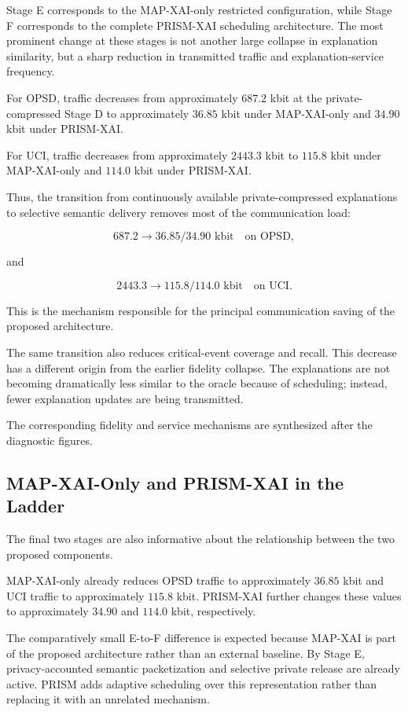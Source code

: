 \documentclass[11pt]{article}
\begin{document}
Stage E corresponds to the MAP-XAI-only restricted configuration, while Stage F corresponds to the complete PRISM-XAI scheduling architecture. The most prominent change at these stages is not another large collapse in explanation similarity, but a sharp reduction in transmitted traffic and explanation-service frequency.

For OPSD, traffic decreases from approximately \(687.2\) kbit at the private-compressed Stage D to approximately \(36.85\) kbit under MAP-XAI-only and \(34.90\) kbit under PRISM-XAI.

For UCI, traffic decreases from approximately \(2443.3\) kbit to \(115.8\) kbit under MAP-XAI-only and \(114.0\) kbit under PRISM-XAI.

Thus, the transition from continuously available private-compressed explanations to selective semantic delivery removes most of the communication load:

$$
687.2
\rightarrow
36.85/34.90\text{ kbit}
\quad\text{on OPSD},
$$

and

$$
2443.3
\rightarrow
115.8/114.0\text{ kbit}
\quad\text{on UCI}.
$$

This is the mechanism responsible for the principal communication saving of the proposed architecture.

The same transition also reduces critical-event coverage and recall. This decrease has a different origin from the earlier fidelity collapse. The explanations are not becoming dramatically less similar to the oracle because of scheduling; instead, fewer explanation updates are being transmitted.

The corresponding fidelity and service mechanisms are synthesized after the diagnostic figures.

\subsection{MAP-XAI-Only and PRISM-XAI in the Ladder}

The final two stages are also informative about the relationship between the two proposed components.

MAP-XAI-only already reduces OPSD traffic to approximately \(36.85\) kbit and UCI traffic to approximately \(115.8\) kbit. PRISM-XAI further changes these values to approximately \(34.90\) and \(114.0\) kbit, respectively.

The comparatively small E-to-F difference is expected because MAP-XAI is part of the proposed architecture rather than an external baseline. By Stage E, privacy-accounted semantic packetization and selective private release are already active. PRISM adds adaptive scheduling over this representation rather than replacing it with an unrelated mechanism.
\end{document}

